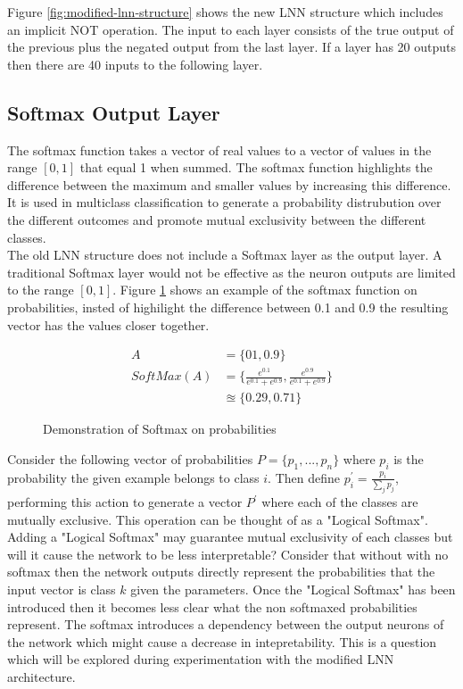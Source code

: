 Figure \ref{fig:modified-lnn-structure} shows the new LNN structure which includes an implicit NOT operation. The input to each layer consists of the true output of the previous plus the negated output from the last layer. If a layer has 20 outputs then there are 40 inputs to the following layer.\\

\subsection{Softmax Output Layer}
The softmax function takes a vector of real values to a vector of values in the range $[0,1]$ that equal 1 when summed. The softmax function highlights the difference between the maximum and smaller values by increasing this difference. It is used in multiclass classification to generate a probability distrubution over the different outcomes and promote mutual exclusivity between the different classes.\\

The old LNN structure does not include a Softmax layer as the output layer. A traditional Softmax layer would not be effective as the neuron outputs are limited to the range $[0,1]$. Figure \ref{fig:softmax-failure} shows an example of the softmax function on probabilities, insted of highilight the difference between 0.1 and 0.9 the resulting vector has the values closer together.

\begin{figure}[H]
\begin{align*}
A &= \{01, 0.9\}\\
SoftMax(A) &= \{ \frac{e^{0.1}}{e^{0.1} + e^{0.9}}, \frac{e^{0.9}}{e^{0.1} + e^{0.9}} \}\\
&\approxeq \{ 0.29, 0.71 \}
\end{align*}
\caption{Demonstration of Softmax on probabilities}
\label{fig:softmax-failure}
\end{figure}

Consider the following vector of probabilities $P = \{p_1, ..., p_n\}$ where $p_i$ is the probability the given example belongs to class $i$. Then define $p_i^{'} = \frac{p_i}{\sum_j p_j}$, performing this action to generate a vector $P^{'}$ where each of the classes are mutually exclusive. This operation can be thought of as a "Logical Softmax".\\

Adding a "Logical Softmax" may guarantee mutual exclusivity of each classes but will it cause the network to be less interpretable? Consider that without with no softmax then the network outputs directly represent the probabilities that the input vector is class $k$ given the parameters. Once the "Logical Softmax" has been introduced then it becomes less clear what the non softmaxed probabilities represent. The softmax introduces a dependency between the output neurons of the network which might cause a decrease in intepretability. This is a question which will be explored during experimentation with the modified LNN architecture.




